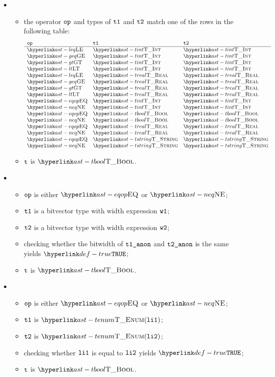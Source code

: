 \begin{itemize}
  \item {}
  \begin{itemize}
    \item the operator $\texttt{op}$ and types of $\texttt{t1}$ and $\texttt{t2}$ match one of the rows in the following table:
    \[
    \begin{array}{lll}
      \mathbf{\op} & \mathbf{\vtone} & \mathbf{\vttwo} \\
      \hline
      \LEQ  & \TInt    & \TInt\\
      \GEQ  & \TInt    & \TInt\\
      \GT   & \TInt    & \TInt\\
      \LT   & \TInt    & \TInt\\
      \LEQ  & \TReal   & \TReal\\
      \GEQ  & \TReal   & \TReal\\
      \GT   & \TReal   & \TReal\\
      \LT   & \TReal   & \TReal\\
      \EQOP & \TInt    & \TInt\\
      \NEQ  & \TInt    & \TInt\\
      \EQOP & \TBool   & \TBool\\
      \NEQ  & \TBool   & \TBool\\
      \EQOP & \TReal   & \TReal\\
      \NEQ  & \TReal   & \TReal\\
      \EQOP & \TString & \TString\\
      \NEQ  & \TString & \TString
    \end{array}
    \]
    \item $\texttt{t}$ is $\TBool$.
  \end{itemize}

  \item {}
  \begin{itemize}
    \item $\texttt{op}$ is either $\EQOP$ or $\NEQ$;
    \item $\texttt{t1}$ is a bitvector type with width expression $\texttt{w1}$;
    \item $\texttt{t2}$ is a bitvector type with width expression $\texttt{w2}$;
    \item checking whether the bitwidth of $\texttt{t1\_anon}$ and $\texttt{t2\_anon}$ is the same yields $\True$\ProseOrTypeError;
    \item $\texttt{t}$ is $\TBool$.
  \end{itemize}

  \item {}
  \begin{itemize}
    \item $\texttt{op}$ is either $\EQOP$ or $\NEQ$;
    \item $\texttt{t1}$ is $\TEnum(\vlione)$;
    \item $\texttt{t2}$ is $\TEnum(\vlitwo)$;
    \item checking whether $\texttt{li1}$ is equal to $\texttt{li2}$ yields $\True$\ProseOrTypeError;
    \item $\texttt{t}$ is $\TBool$.
  \end{itemize}


\end{itemize}
